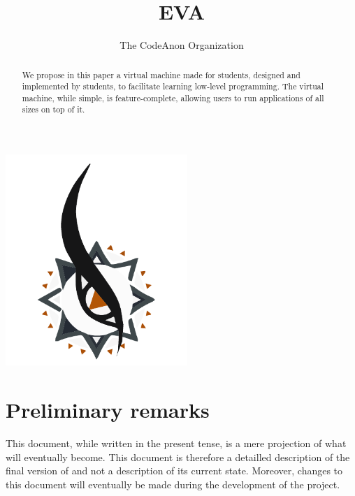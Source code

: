 \documentclass[11pt,twoside]{article}
\begin{document}
\title{EVA}
\author{The CodeAnon Organization}

\maketitle
\begin{abstract}
  We propose in this paper a virtual machine made for students, designed and implemented by students, to facilitate learning low-level programming. The virtual machine, while simple, is feature-complete, allowing users to run applications of all sizes on top of it.
\end{abstract}
\vfill
\begin{center}
  \includegraphics[height=8cm]{logo_graph.pdf}
\end{center}
\vfill

\cleardoublepage

\hspace{0pt}
\vfill

\section*{Preliminary remarks}

This document, while written in the present tense, is a mere projection of what  will eventually become. This document is therefore a detailled description of the final version of  and not a description of its current state. Moreover, changes to this document will eventually be made during the development of the project.

\vfill

\clearpage

\tableofcontents
\cleardoublepage

\hspace{0pt}
\vfill
\end{document}
